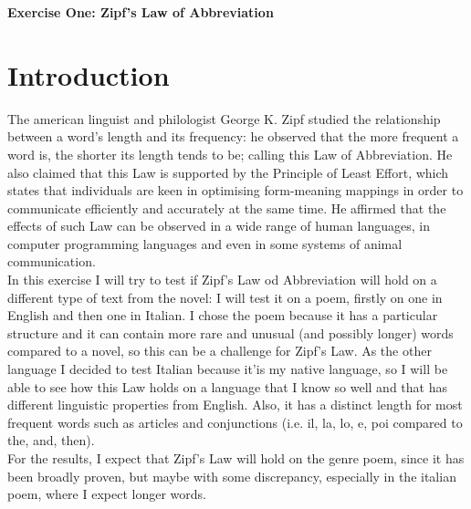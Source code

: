 \begin{flushleft}
    {\fontsize{16}{18}\selectfont\textbf{Exercise One: Zipf’s Law of Abbreviation}} 
\end{flushleft}

\section{Introduction}
The american linguist and philologist George K. Zipf studied the relationship between a word’s length and its frequency: he observed that the more frequent a word is, the shorter its length tends to be; calling this Law of Abbreviation. 
He also claimed that this Law is supported by the Principle of Least Effort, which states that individuals are keen in optimising form-meaning mappings in order to communicate efficiently and accurately at the same time. 
He affirmed that the effects of such Law can be observed in a wide range of human languages, in computer programming languages and even in some systems of animal communication.\\
In this exercise I will try to test if Zipf's Law od Abbreviation will hold on a different type of text from the novel: I will test it on a poem, firstly on one in English and then one in Italian. 
I chose the poem because it has a particular structure and it can contain more rare and unusual (and possibly longer) words compared to a novel, so this can be a challenge for Zipf's Law. 
As the other language I decided to test Italian because it'is my native language, so I will be able to see how this Law holds on a language that I know so well and that has different linguistic properties from English. 
Also, it has a distinct length for most frequent words such as articles and conjunctions (i.e. il, la, lo, e, poi compared to the, and, then).\\
For the results, I expect that Zipf's Law will hold on the genre poem, since it has been broadly proven, but maybe with some discrepancy, especially in the italian poem, where I expect longer words.


